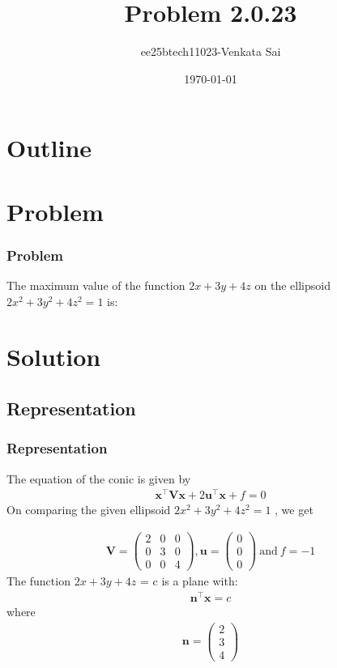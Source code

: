 \documentclass{beamer}
\title{Problem 2.0.23}
\author{ee25btech11023-Venkata Sai}
\date{\today}
\theoremstyle{remark}
\newcommand{\myvec}[1]{\ensuremath{\begin{pmatrix}#1\end{pmatrix}}}
\let\vec\mathbf
\numberwithin{equation}{section}
\begin{document}
\begin{frame}
\titlepage
\end{frame}

\section*{Outline}
\begin{frame}
\tableofcontents
\end{frame}

\section{Problem}

\begin{frame}
\frametitle{Problem}
The maximum value of the function $2x + 3y + 4z$ on the ellipsoid $2x^2 + 3y^2 + 4z^2 = 1$ is:
\end{frame}
\section{Solution}

\subsection{Representation}
\setcounter{section}{1}
\begin{frame}
\frametitle{Representation}
The equation of the conic is given by
\begin{align}
     \vec{x}^\top\vec{V}\vec{x} + 2\vec{u}^\top\vec{x} + f = 0
\end{align}
On comparing the given ellipsoid $2x^2 + 3y^2 + 4z^2 = 1$ , we get

\medskip
\begin{align}
\vec{V} =  \myvec{ 2 & 0 & 0 \\ 0 & 3 & 0 \\ 0 & 0 & 4 },  \vec{u} = \myvec{ 0 \\ 0 \\ 0 }\  \text{and}\ f = -1 
\end{align}
The function $2x + 3y + 4z$ = c is a plane with:
\begin{align}
    \vec{n}^\top\vec{x} = c 
\end{align}
where
\begin{align}
\vec{n} = \myvec{ 2 \\ 3 \\ 4 }
\end{align}
\end{frame}
\end{document}
